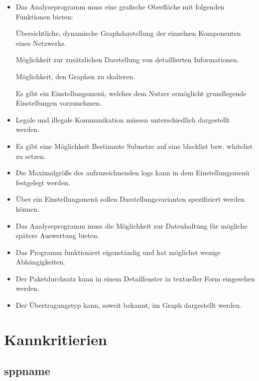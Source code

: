 \begin{itemize}
\item Das Analyseprogramm muss eine grafische Oberfläche mit folgenden Funktionen bieten:

    \subitem Übersichtliche, dynamische Graphdarstellung der einzelnen Komponenten eines Netzwerks.

    \subitem Möglichkeit zur zusätzlichen Darstellung von detaillierten Informationen.

    \subitem Möglichkeit, den Graphen zu skalieren.

    \subitem Es gibt ein Einstellungsmenü, welches dem Nutzer ermöglicht grundlegende Einstellungen vorzunehmen.

\item Legale und illegale Kommunikation müssen unterschiedlich dargestellt werden.

\item Es gibt eine Möglichkeit Bestimmte Subnetze auf eine \gls{blacklist} bzw. \gls{whitelist} zu setzen.

\item Die Maximalgröße des aufzuzeichnenden \glspl{log} kann in dem Einstellungsmenü festgelegt werden.

\item Über ein Einstellungsmenü sollen Darstellungsvarianten spezifiziert werden können.

\item Das Analyseprogramm muss die Möglichkeit zur Datenhaltung für mögliche spätere Auswertung bieten.

\item Das Programm funktioniert eigenständig und hat möglichst wenige Abhängigkeiten.

\item Der Paketdurchsatz kann in einem Detailfenster in textueller Form eingesehen werden.

\item Der Übertragungstyp kann, soweit bekannt, im Graph dargestellt werden.
\end{itemize}

\section{Kannkritierien}

\subsection{\gls{sppname}}

